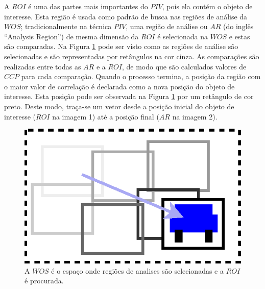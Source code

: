 A $ROI$ é uma das partes mais importantes do $PIV$, pois ela contém o objeto de interesse. 
Esta região é usada como padrão de busca nas regiões de análise da $WOS$;
tradicionalmente na técnica $PIV$, uma região de análise ou $AR$ (do inglês ``Analysis Region'') de mesma dimensão 
da $ROI$ é selecionada na $WOS$ e estas são comparadas.
Na Figura \ref{fig:WOSdivided} pode ser visto como as regiões 
de análise são selecionadas e são representadas por retângulos na cor cinza.
As comparações são realizadas entre todas as $AR$ e a $ROI$, de modo que são 
calculados valores de $CCP$ para cada comparação. Quando o processo termina, a posição da região com o maior valor
de correlação é declarada como a nova posição do objeto de interesse. 
Esta posição pode ser observada na Figura \ref{fig:WOSdivided}
por um retângulo de cor preto. Deste modo, traça-se um vetor desde a posição inicial do objeto 
de interesse ($ROI$ na imagem 1) até a posição final ($AR$ na imagem 2).
\begin{figure}[H]
\centering
\includegraphics[width=0.8\columnwidth]{images/WOSdivided.eps}
\caption{A $WOS$ é o espaço onde regiões de analises são selecionadas e a $ROI$ é procurada.}
\label{fig:WOSdivided}
\end{figure}
